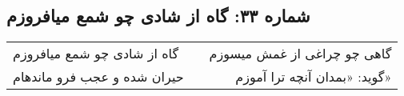 \begin{center}
\section*{شماره ۳۳: گاه از شادی چو شمع میافروزم}
\label{sec:033}
\begin{longtable}{l p{0.5cm} r}
گاه از شادی چو شمع میافروزم
&&
گاهی چو چراغی از غمش میسوزم
\\
حیران شده و عجب فرو ماندهام
&&
گوید: «بمدان آنچه ترا آموزم»
\\
\end{longtable}
\end{center}

